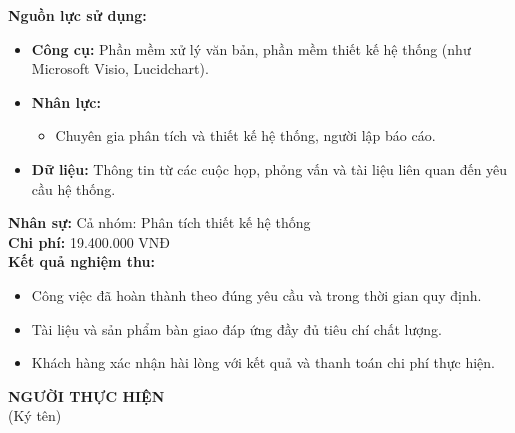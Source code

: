 {\begin{minipage}{\textwidth}
        \noindent\textbf{Nguồn lực sử dụng:}
        \begin{itemize}
            \item \textbf{Công cụ:} Phần mềm xử lý văn bản, phần mềm thiết kế hệ thống (như Microsoft Visio, Lucidchart).
            \item \textbf{Nhân lực:}
                  \begin{itemize}
                      \item  Chuyên gia phân tích và thiết kế hệ thống, người lập báo cáo.
                  \end{itemize}
            \item \textbf{Dữ liệu:} Thông tin từ các cuộc họp, phỏng vấn và tài liệu liên quan đến yêu cầu hệ thống.
        \end{itemize}
        \noindent\textbf{Nhân sự:} Cả nhóm: Phân tích thiết kế hệ thống \\
        \noindent\textbf{Chi phí:} 19.400.000 VNĐ \\
        \noindent\textbf{Kết quả nghiệm thu:}
        \begin{itemize}
            \item Công việc đã hoàn thành theo đúng yêu cầu và trong thời gian quy định.
            \item Tài liệu và sản phẩm bàn giao đáp ứng đầy đủ tiêu chí chất lượng.
            \item Khách hàng xác nhận hài lòng với kết quả và thanh toán chi phí thực hiện.
        \end{itemize}

        \begin{flushleft}
            \hspace{8cm} \textbf{NGƯỜI THỰC HIỆN} \\
            \hspace{9.5cm} (Ký tên) \\ \vspace{1cm}
        \end{flushleft}
    \end{minipage}
}

\clearpage
